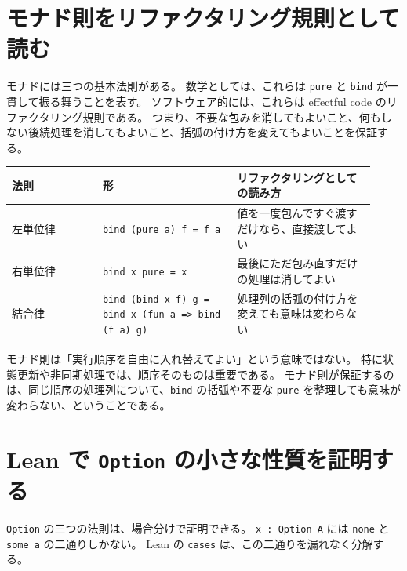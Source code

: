 
\section{モナド則をリファクタリング規則として読む}

モナドには三つの基本法則がある。
数学としては、これらは \texttt{pure} と \texttt{bind} が一貫して振る舞うことを表す。
ソフトウェア的には、これらは effectful code のリファクタリング規則である。
つまり、不要な包みを消してもよいこと、何もしない後続処理を消してもよいこと、括弧の付け方を変えてもよいことを保証する。

\begin{center}
\begin{tabular}{p{0.23\linewidth}p{0.34\linewidth}p{0.35\linewidth}}
\toprule
法則 & 形 & リファクタリングとしての読み方 \\
\midrule
左単位律 & \texttt{bind (pure a) f = f a} & 値を一度包んですぐ渡すだけなら、直接渡してよい \\
右単位律 & \texttt{bind x pure = x} & 最後にただ包み直すだけの処理は消してよい \\
結合律 & \texttt{bind (bind x f) g = bind x (fun a => bind (f a) g)} & 処理列の括弧の付け方を変えても意味は変わらない \\
\bottomrule
\end{tabular}
\end{center}

\begin{softwarebox}
モナド則は「実行順序を自由に入れ替えてよい」という意味ではない。
特に状態更新や非同期処理では、順序そのものは重要である。
モナド則が保証するのは、同じ順序の処理列について、\texttt{bind} の括弧や不要な \texttt{pure} を整理しても意味が変わらない、ということである。
\end{softwarebox}


\section{Lean で \texttt{Option} の小さな性質を証明する}

\texttt{Option} の三つの法則は、場合分けで証明できる。
\texttt{x : Option A} には \texttt{none} と \texttt{some a} の二通りしかない。
Lean の \texttt{cases} は、この二通りを漏れなく分解する。

